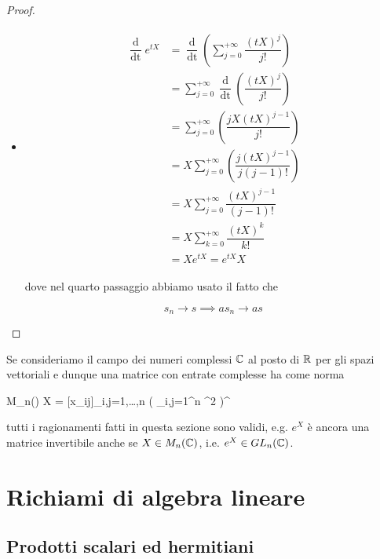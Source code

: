 \begin{proof}
\begin{itemize}
		\item %
		\begin{align}
			\begin{split}
				\dfrac{\operatorname{d}}{\operatorname{dt}} e^{t X} &= \dfrac{\operatorname{d}}{\operatorname{dt}} \left( \sum_{j=0}^{+\infty} \dfrac{(t X)^{j}}{j!} \right)\\
				&= \sum_{j=0}^{+\infty} \dfrac{\operatorname{d}}{\operatorname{dt}} \left( \dfrac{(t X)^{j}}{j!} \right)\\
				&= \sum_{j=0}^{+\infty} \left( \dfrac{j X (t X)^{j-1}}{j!} \right)\\
				&= X \sum_{j=0}^{+\infty} \left( \dfrac{j (t X)^{j-1}}{j (j-1)!} \right)\\
				&= X \sum_{j=0}^{+\infty} \dfrac{(t X)^{j-1}}{(j-1)!}\\
				&= X \sum_{k=0}^{+\infty} \dfrac{(t X)^{k}}{k!}\\
				&= X e^{t X} = e^{t X} X
			\end{split}
		\end{align}
	
		dove nel quarto passaggio abbiamo usato il fatto che
		
		\begin{equation}
			s_{n} \to s \implies a s_{n} \to a s
		\end{equation}
	\end{itemize}
\end{proof}

\begin{remark}
	Se consideriamo il campo dei numeri complessi $ \mathbb{C} $ al posto di $ \mathbb{R} $ per gli spazi vettoriali e dunque una matrice con entrate complesse ha come norma
	
	\map{\norm{}}%
		{M_{n}(\C)}%
		{\R}%
		{X = [x_{ij}]_{i,j=1,\dots,n}}%
		{\left( \sum_{i,j=1}^{n} ^{2} \right)^{}}
		
	tutti i ragionamenti fatti in questa sezione sono validi, e.g. $ e^{X} $ è ancora una matrice invertibile anche se $ X \in M_{n}(\mathbb{C}) $, i.e. $ e^{X} \in GL_{n}(\mathbb{C}) $.
\end{remark}

\section{Richiami di algebra lineare}

\subsection{Prodotti scalari ed hermitiani}

